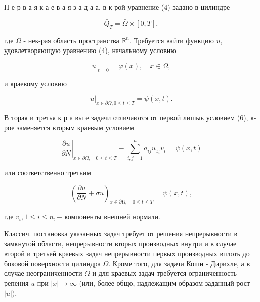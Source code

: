 \documentclass[10pt]{article}
\begin{document}
П е р в а я к а е в а я з а д а а, в к-рой уравнение (4) задано в цилиндре



\[

\bar{Q}_{T}=\bar{\Omega} \times[0, T],

\]



где $\Omega$ - нек-рая область пространства $\mathbb{R}^{n}$. Требуется вайти функцию $u$, удовлетворяющую уравнению (4), начальному условию



\[

\left.u\right|_{t=0}=\varphi(x), \quad x \in \Omega,

\]



и краевому условию



\[

\left.u\right|_{x \in \partial \Omega, 0 \leqslant t \leqslant T}=\psi(x, t) .

\]



В торая и третья к р а вы е задачи отличаются от первой лишыь условием (6), к-рое заменяется вторым краевым условием



\[

\left.\frac{\partial u}{\partial N}\right|_{x \in \partial \Omega, \quad 0 \leqslant t \leqslant T} \equiv \sum_{i, j=1}^{n} a_{i j} u_{x_{i}} v_{i}=\psi(x, t)

\]



или соответственно третьим



\[

\left(\frac{\partial u}{\partial N}+\sigma u\right)_{x \in \partial \Omega, \quad 0 \leqslant t \leqslant T}=\psi(x, t),

\]



где $v_{i}, 1 \leqslant i \leqslant n,-$ компоненты внешней нормали.



Классич. постановка указанных задач требует от решения непрерывности в замкнутой области, непрерывности вторых производных внутри и в случае второй и третьей краевых задач непрерывности первых производных вплоть до боковой поверхности цилиндра $\Omega$. Кроме того, для задачи Коши - Дирихле, а в случае неограниченности $\Omega$ и для краевых задач требуется ограниченность репения $u$ при $|x| \rightarrow \infty$ (или, более общо, надлежащим образом заданный рост $|u|)$,
\end{document}
